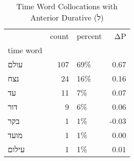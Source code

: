 \begin{table}[htbp!]
\centering
\caption{Time Word Collocations with Anterior Durative (ל)}
\label{table:antdurל_head_cpd}
\begin{tabular}{lrlr}
\toprule
{} &  count & percent &    ΔP \\
time word &        &         &       \\
\midrule
עולם      &    107 &     69\% &  0.67 \\
נצח       &     24 &     16\% &  0.16 \\
עד        &     11 &      7\% &  0.07 \\
דור       &      9 &      6\% &  0.06 \\
בקר       &      1 &      1\% & -0.03 \\
מועד      &      1 &      1\% &  0.00 \\
עילום     &      1 &      1\% &  0.01 \\
\bottomrule
\end{tabular}
\end{table}
